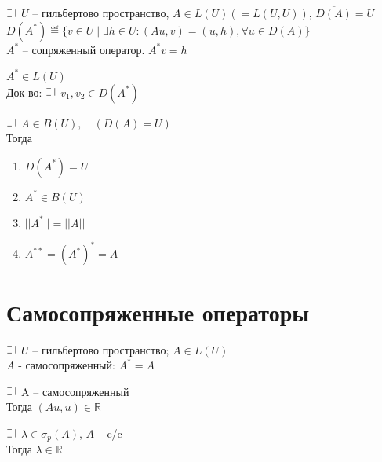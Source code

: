 \begin{definition}
  $\letus$ $U$ -- гильбертово пространство, $A \in L(U) (= L(U, U)), \, \overline{D(A)} = U$\\
  $D(A^*) \eqdef \{v \in U \mid \exists h \in U: (Au, v) = (u,h), \forall u \in D(A)\}$\\
  $A^*$ -- сопряженный оператор. $A^*v=h$
\end{definition}

\begin{utv}
  $A^{*} \in L(U)$\\
  Док-во:
  $\letus$ $v_1, v_2 \in D(A^*) \ $
\end{utv}

\begin{theorem}
  $\letus$ $A \in B(U), \quad (D(A) = U)$\\
  Тогда\begin{minipage}[t]{0.8\linewidth}\begin{enumerate}[itemsep=1mm]
    \item $D(A^*) = U$
    \item $A^* \in B(U)$
    \item $||A^*|| = ||A||$
    \item $A^{**} = (A^*)^* = A$
  \end{enumerate}\end{minipage}
\end{theorem}

\section*{Самосопряженные операторы}

\begin{definition}
$\letus$ $U$ -- гильбертово пространство; $A \in L(U)$ \\
$A$ - самосопряженный: $A^* = A$
\end{definition}

\begin{utv}[1]
  $\letus$ A -- самосопряженный\\
  Тогда $(Au, u) \in \mathbb{R}$
\end{utv}

\begin{utv}[2]
  $\letus$ $\lambda \in \sigma_p(A)$, $A$ -- c/c\\
  Тогда $\lambda \in \mathbb{R}$
\end{utv}

